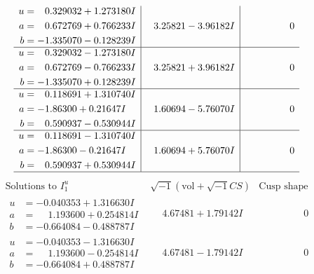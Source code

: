 \documentclass[1p]{elsarticle_modified}
\theoremstyle{definition}
\newcommand{\I}{\sqrt{-1}}
\begin{document}
$$\begin{array}{c|c|c}
\begin{aligned}
u &= \phantom{-}0.329032 + 1.273180 I \\
a &= \phantom{-}0.672769 + 0.766233 I \\
b &= -1.335070 - 0.128239 I\end{aligned}
 & \phantom{-}3.25821 - 3.96182 I & \phantom{-0.000000 } 0 \\ \hline\begin{aligned}
u &= \phantom{-}0.329032 - 1.273180 I \\
a &= \phantom{-}0.672769 - 0.766233 I \\
b &= -1.335070 + 0.128239 I\end{aligned}
 & \phantom{-}3.25821 + 3.96182 I & \phantom{-0.000000 } 0 \\ \hline\begin{aligned}
u &= \phantom{-}0.118691 + 1.310740 I \\
a &= -1.86300 + 0.21647 I \\
b &= \phantom{-}0.590937 - 0.530944 I\end{aligned}
 & \phantom{-}1.60694 - 5.76070 I & \phantom{-0.000000 } 0 \\ \hline\begin{aligned}
u &= \phantom{-}0.118691 - 1.310740 I \\
a &= -1.86300 - 0.21647 I \\
b &= \phantom{-}0.590937 + 0.530944 I\end{aligned}
 & \phantom{-}1.60694 + 5.76070 I & \phantom{-0.000000 } 0\\
 \hline 
 \end{array}$$\newpage$$\begin{array}{c|c|c}  
\text{Solutions to }I^u_{1}& \I (\text{vol} + \sqrt{-1}CS) & \text{Cusp shape}\\
 \hline 
\begin{aligned}
u &= -0.040353 + 1.316630 I \\
a &= \phantom{-}1.193600 + 0.254814 I \\
b &= -0.664084 - 0.488787 I\end{aligned}
 & \phantom{-}4.67481 + 1.79142 I & \phantom{-0.000000 } 0 \\ \hline\begin{aligned}
u &= -0.040353 - 1.316630 I \\
a &= \phantom{-}1.193600 - 0.254814 I \\
b &= -0.664084 + 0.488787 I\end{aligned}
 & \phantom{-}4.67481 - 1.79142 I & \phantom{-0.000000 } 0 \\ \hline\begin{aligned}

\end{aligned}
\end{array}$$
\end{document}
